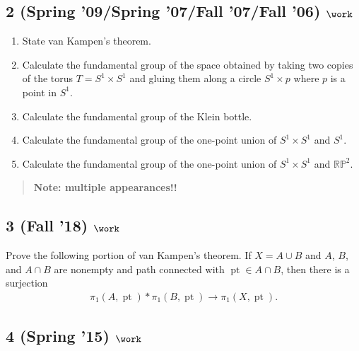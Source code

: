 \hypertarget{spring-09spring-07fall-07fall-06-work}{%
\subsection{\texorpdfstring{2 (Spring '09/Spring '07/Fall '07/Fall '06)
\(\work\)}{2 (Spring '09/Spring '07/Fall '07/Fall '06) \textbackslash work}}\label{spring-09spring-07fall-07fall-06-work}}

\begin{enumerate}
\def\labelenumi{\alph{enumi}.}
\item
  State van Kampen's theorem.
\item
  Calculate the fundamental group of the space obtained by taking two
  copies of the torus \(T = S^1 \times S^1\) and gluing them along a
  circle \(S^1 \times {p}\) where \(p\) is a point in \(S^1\).
\item
  Calculate the fundamental group of the Klein bottle.
\item
  Calculate the fundamental group of the one-point union of
  \(S^1 \times S^1\) and \(S^1\).
\item
  Calculate the fundamental group of the one-point union of
  \(S^1 \times S^1\) and \({\mathbb{RP}}^2\).
\end{enumerate}

\begin{quote}
\textbf{Note: multiple appearances!!}
\end{quote}

\hypertarget{fall-18-work-2}{%
\subsection{\texorpdfstring{3 (Fall '18)
\(\work\)}{3 (Fall '18) \textbackslash work}}\label{fall-18-work-2}}

Prove the following portion of van Kampen's theorem. If \(X = A\cup B\)
and \(A\), \(B\), and \(A \cap B\) are nonempty and path connected with
\({\operatorname{pt}}\in A \cap B\), then there is a surjection
\begin{align*}
\pi_1 (A, {\operatorname{pt}}) \ast \pi_1 (B, {\operatorname{pt}}) \to \pi_1 (X, {\operatorname{pt}})
.\end{align*}

\hypertarget{spring-15-work-1}{%
\subsection{\texorpdfstring{4 (Spring '15)
\(\work\)}{4 (Spring '15) \textbackslash work}}\label{spring-15-work-1}}

